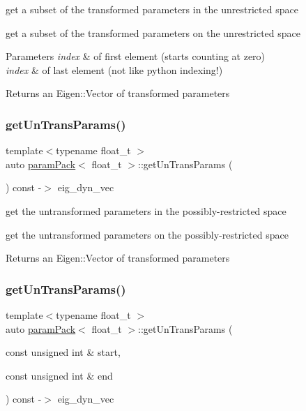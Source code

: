 get a subset of the transformed parameters in the unrestricted space 

get a subset of the transformed parameters on the unrestricted space 
\begin{DoxyParams}{Parameters}
{\em index} & of first element (starts counting at zero) \\
\hline
{\em index} & of last element (not like python indexing!) \\
\hline
\end{DoxyParams}
\begin{DoxyReturn}{Returns}
an Eigen\+::\+Vector of transformed parameters 
\end{DoxyReturn}
\mbox{\label{classparamPack_ad655cb6e6fea5c5f7d2e3c158467e7db}} 
\subsubsection{\texorpdfstring{get\+Un\+Trans\+Params()}{getUnTransParams()}\hspace{0.1cm}{\footnotesize\ttfamily [1/2]}}
{\footnotesize\ttfamily template$<$typename float\+\_\+t $>$ \\
auto \hyperlink{classparamPack}{param\+Pack}$<$ float\+\_\+t $>$\+::get\+Un\+Trans\+Params (\begin{DoxyParamCaption}{ }\end{DoxyParamCaption}) const -\/$>$ eig\+\_\+dyn\+\_\+vec}



get the untransformed parameters in the possibly-\/restricted space 

get the untransformed parameters on the possibly-\/restricted space \begin{DoxyReturn}{Returns}
an Eigen\+::\+Vector of transformed parameters 
\end{DoxyReturn}
\mbox{\label{classparamPack_abe83b3043897bf62b6026f6c461942c6}} 
\subsubsection{\texorpdfstring{get\+Un\+Trans\+Params()}{getUnTransParams()}\hspace{0.1cm}{\footnotesize\ttfamily [2/2]}}
{\footnotesize\ttfamily template$<$typename float\+\_\+t $>$ \\
auto \hyperlink{classparamPack}{param\+Pack}$<$ float\+\_\+t $>$\+::get\+Un\+Trans\+Params (\begin{DoxyParamCaption}\item[{const unsigned int \&}]{start,  }\item[{const unsigned int \&}]{end }\end{DoxyParamCaption}) const -\/$>$ eig\+\_\+dyn\+\_\+vec}




